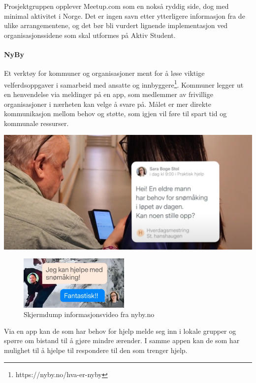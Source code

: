 \vspace{5mm} %

Prosjektgruppen opplever Meetup.com som en nokså ryddig side, dog med minimal aktivitet i Norge. Det er ingen savn etter ytterligere informasjon fra de ulike arrangementene, og det bør bli vurdert lignende implementasjon ved organisasjonssidene som skal utformes på Aktiv Student.

\paragraph{NyBy} Et verktøy for kommuner og organisasjoner ment for å løse viktige velferdsoppgaver i samarbeid med ansatte og innbyggere\footnote{https://nyby.no/hva-er-nyby}. Kommuner legger ut en henvendelse via meldinger på en app, som medlemmer av frivillige organisasjoner i nærheten kan velge å svare på. Målet er mer direkte kommunikasjon mellom behov og støtte, som igjen vil føre til spart tid og kommunale ressurser.

\vspace{5mm} %

\includegraphics[width=\textwidth]{Illustrasjoner/andre_platformer/nyby_henvendelse.png}

\vspace{5mm} %
\begin{figure}
  \begin{center}
    \includegraphics[width=0.48\textwidth]{Illustrasjoner/andre_platformer/nyby_svar.png}
  \end{center}
  \caption{Skjermdump informasjonsvideo fra nyby.no}
\end{figure}
Via en app kan de som har behov for hjelp melde seg inn i lokale grupper og spørre om bistand til å gjøre mindre ærender. I samme appen kan de som har mulighet til å hjelpe til respondere til den som trenger hjelp.

